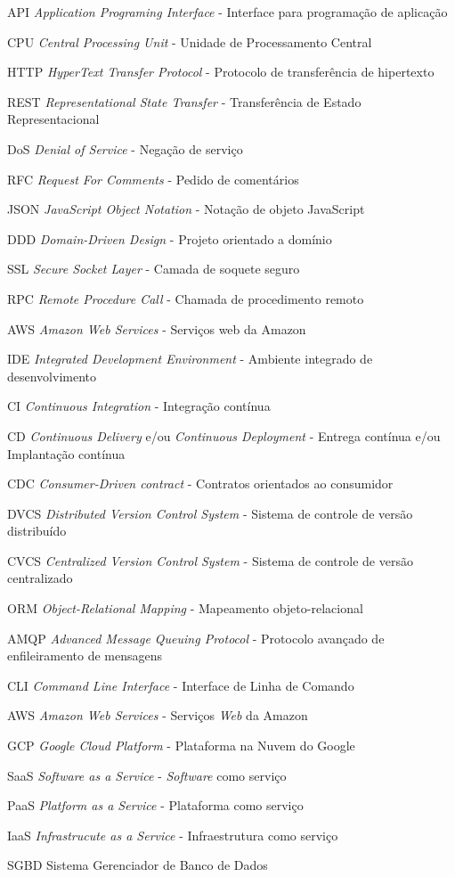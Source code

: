 
\begin{siglas}
	\item[API]{\emph{Application Programing Interface} - Interface para programação de aplicação}
	\item[CPU]{\emph{Central Processing Unit} - Unidade de Processamento Central}
	\item[HTTP]{\emph{HyperText Transfer Protocol} - Protocolo de transferência de hipertexto}
	\item[REST]{\emph{Representational State Transfer} - Transferência de Estado Representacional}
	\item[DoS]{\emph{Denial of Service} - Negação de serviço}
	\item[RFC]{\emph{Request For Comments} - Pedido de comentários}
	\item[JSON]{\emph{JavaScript Object Notation} - Notação de objeto JavaScript}
	\item[DDD]{\emph{Domain-Driven Design} - Projeto orientado a domínio}
	\item[SSL]{\emph{Secure Socket Layer} - Camada de soquete seguro}
	\item[RPC]{\emph{Remote Procedure Call} - Chamada de procedimento remoto}
	\item[AWS]{\emph{Amazon Web Services} - Serviços web da Amazon}
	\item[IDE]{\emph{Integrated Development Environment} - Ambiente integrado de desenvolvimento}
	\item[CI]{\emph{Continuous Integration} - Integração contínua}
	\item[CD]{\emph{Continuous Delivery} e/ou \emph{Continuous Deployment} - Entrega contínua e/ou Implantação contínua}
	\item[CDC]{\emph{Consumer-Driven contract} - Contratos orientados ao consumidor}
	\item[DVCS]{\emph{Distributed Version Control System} - Sistema de controle de versão distribuído}
	\item[CVCS]{\emph{Centralized Version Control System} - Sistema de controle de versão centralizado}
	\item[ORM]{\emph{Object-Relational Mapping} - Mapeamento objeto-relacional}
	\item[AMQP]{\emph{Advanced Message Queuing Protocol} - Protocolo avançado de enfileiramento de mensagens}
	\item[CLI]{\emph{Command Line Interface} - Interface de Linha de Comando}
	\item[AWS]{\emph{Amazon Web Services} - Serviços \emph{Web} da Amazon}
	\item[GCP]{\emph{Google Cloud Platform} - Plataforma na Nuvem do Google}
	\item[SaaS]{\emph{Software as a Service} - \emph{Software} como serviço}
	\item[PaaS]{\emph{Platform as a Service} - Plataforma como serviço}
	\item[IaaS]{\emph{Infrastrucute as a Service} - Infraestrutura como serviço}
	\item[SGBD]{Sistema Gerenciador de Banco de Dados}
\end{siglas}